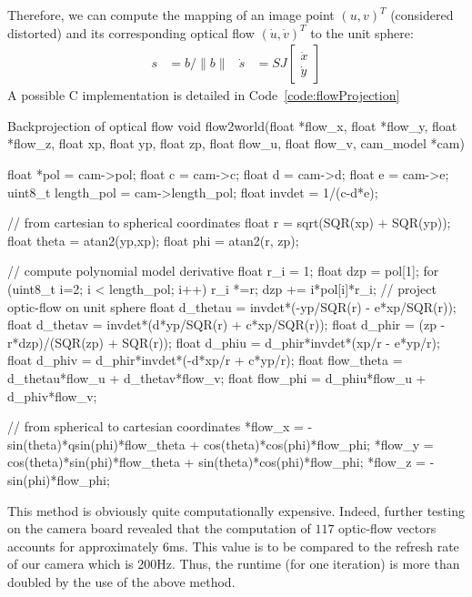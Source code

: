 Therefore, we can compute the mapping of an image point $(u,v)^T$ (considered distorted) and its corresponding optical flow $(\dot{u}, \dot{v})^T$ to the unit sphere:
\begin{align}
s &= b/\|b\| & \dot{s} &= SJ \begin{bmatrix} \dot{x} \\ \dot{y} \end{bmatrix}
\end{align}
A possible C implementation is detailed in Code~\ref{code:flowProjection}

\begin{center}
\begin{code}[colback=white, label=code:flowProjection]{Backprojection of optical flow}
void flow2world(float *flow_x, float *flow_y, float *flow_z, 
		float xp, float yp, float zp, float flow_u, 
		float flow_v, cam_model *cam)
{
	 float *pol    = cam->pol;
	 float c       = cam->c;
	 float d       = cam->d;
	 float e       = cam->e;
	 uint8_t length_pol = cam->length_pol;
	 float invdet  = 1/(c-d*e); 
	 
	 // from cartesian to spherical coordinates
	 float r   = sqrt(SQR(xp) + SQR(yp));
	 float theta = atan2(yp,xp);
	 float phi = atan2(r, zp); 
	 
	 // compute polynomial model derivative
	 float r_i = 1;
	 float dzp = pol[1];
	 for (uint8_t i=2; i < length_pol; i++)
	 {
	   r_i *=r;
	   dzp += i*pol[i]*r_i;
	 }
	 // project optic-flow on unit sphere
	 float d_thetau = invdet*(-yp/SQR(r) - e*xp/SQR(r));
	 float d_thetav = invdet*(d*yp/SQR(r) + c*xp/SQR(r));
	 float d_phir = (zp - r*dzp)/(SQR(zp) + SQR(r));
	 float d_phiu = d_phir*invdet*(xp/r - e*yp/r);
	 float d_phiv = d_phir*invdet*(-d*xp/r + c*yp/r);
	 float flow_theta = d_thetau*flow_u 
	 		   + d_thetav*flow_v;
	 float flow_phi = d_phiu*flow_u + d_phiv*flow_v;
	 
	 // from spherical to cartesian coordinates
	 *flow_x = -sin(theta)*qsin(phi)*flow_theta 
	 	   + cos(theta)*cos(phi)*flow_phi;
	 *flow_y = cos(theta)*sin(phi)*flow_theta 
	 	   + sin(theta)*cos(phi)*flow_phi;
	 *flow_z = -sin(phi)*flow_phi;
}
\end{code}
\end{center}

This method is obviously quite computationally expensive. Indeed, further testing on the camera board revealed that the computation of $117$ optic-flow vectors accounts for approximately 6ms. This value is to be compared to the refresh rate of our camera which is 200Hz. Thus, the runtime (for one iteration) is more than doubled by the use of the above method. 

